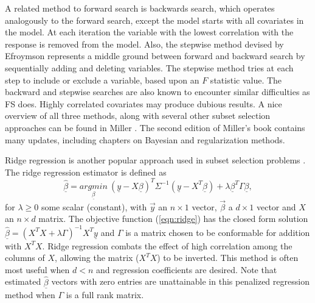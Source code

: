 A related method to forward search is backwards search, which operates analogously to the forward search, except the model starts with all covariates in the model. At each iteration the variable with the lowest correlation with the response is removed from the model. Also, the stepwise method devised by Efroymson \cite{efroymson1960multiple} represents a middle ground between forward and backward search by sequentially adding and deleting variables. The stepwise method tries at each step to include or exclude a variable, based upon an $F$ statistic value. The backward and stepwise searches are also known to encounter similar difficulties as FS \cite{miller2002subset} does. Highly correlated covariates may produce dubious results. A nice overview of all three methods, along with several other subset selection approaches can be found in Miller \cite{miller2002subset}. The second edition of Miller's book contains many updates, including chapters on Bayesian and regularization methods.  

 Ridge regression is another popular approach used in subset selection problems \cite{hoerl1970ridge}. The ridge regression estimator is defined as 
 \begin{equation}\label{eqn:ridge}
 \underline{\hat{\beta}}= \underset{\underline{\beta}}{argmin}\ (\underline{y} -X\underline{\beta})^T\Sigma^{-1}(\underline{y} -X^T\underline{\beta}) + \lambda\underline{\beta}^T\Gamma\underline{\beta},
 \end{equation}
for $\lambda\geq 0$ some scalar (constant), with $\vec{y}$ an $n \times 1$ vector, $\vec{\beta}$ a $d\times 1$ vector and $X$ an $n \times d $ matrix. The objective function (\ref{eqn:ridge}) has the closed form solution $\underline{\hat{\beta}} = (X^TX+\lambda\Gamma)^{-1}X^T\underline{y}$ and $\Gamma$ is a matrix chosen to be conformable for addition with $X^TX$. Ridge regression combats the effect of high correlation among the columns of $X$, allowing the matrix ($X^TX$) to be inverted. This method is often most useful when $d<n$ and regression coefficients are desired. Note that estimated $\hat{\underline{\beta}}$ vectors with zero entries are unattainable in this penalized regression method when $\Gamma$ is a full rank matrix.
 
